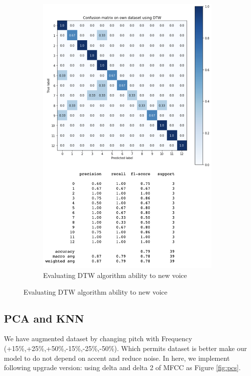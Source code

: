 \documentclass[%
  article,%
  10pt,%
  a4paper,%
  fleqn,%
  oneside,%
  sumario = tradicional,%
  chapter = TITLE,%
  section = TITLE,%
]{abntex2}
\begin{document}
\begin{figure}
\begin{minipage}[b]{.4\textwidth}
\begin{figure}[H]
  \includegraphics[width = \columnwidth]{./Figuras/dtwnewvoice}
   \caption{Evaluating DTW algorithm ability to new voice}
   \label{fig:dtwnewvoice}
\end{figure}
\end{minipage}
\end{figure}
\subsection{PCA and KNN}
We have augmented dataset by changing pitch with Frequency (+15\%,+25\%,+50\%,-15\%,-25\%,-50\%). Which permits dataset is better make our model to do not depend on accent and reduce noise. In here, we implement following upgrade version: using delta and delta 2 of MFCC as Figure \ref{fig:pcs}\cite{8538414}.
\end{document}
